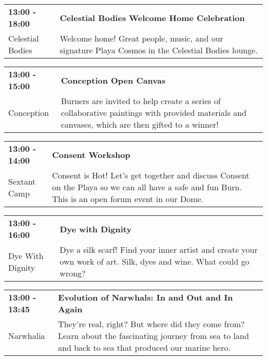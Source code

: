 \begin{tabular}{ p{1in} p{2.2in} }
    \textbf{13:00 - 18:00} & \textbf{Celestial Bodies Welcome Home Celebration} \\
    Celestial Bodies \newline  & Welcome home! Great people, music, and our signature Playa Cosmos in the Celestial Bodies lounge. \\
    \hline 
\end{tabular}
    
\begin{tabular}{ p{1in} p{2.2in} }
    \textbf{13:00 - 15:00} & \textbf{Conception Open Canvas} \\
    Conception \newline  & Burners are invited to help create a series of collaborative paintings with provided materials and canvases, which are then gifted to a winner! \\
    \hline 
\end{tabular}
    
\begin{tabular}{ p{1in} p{2.2in} }
    \textbf{13:00 - 14:00} & \textbf{Consent Workshop} \\
    Sextant Camp \newline  & Consent is Hot! Let's get together and discuss Consent on the Playa so we can all have a safe and fun Burn. This is an open forum event in our Dome. \\
    \hline 
\end{tabular}
    
\begin{tabular}{ p{1in} p{2.2in} }
    \textbf{13:00 - 16:00} & \textbf{Dye with Dignity} \\
    Dye With Dignity \newline  & Dye a silk scarf! Find your inner artist and create your own work of art. Silk, dyes and wine. What could go wrong? \\
    \hline 
\end{tabular}
    
\begin{tabular}{ p{1in} p{2.2in} }
    \textbf{13:00 - 13:45} & \textbf{Evolution of Narwhals: In and Out and In Again} \\
    Narwhalia \newline  & They're real, right? But where did they come from? Learn about the fascinating journey from sea to land and back to sea that produced our marine hero. \\
    \hline 
\end{tabular}
    
